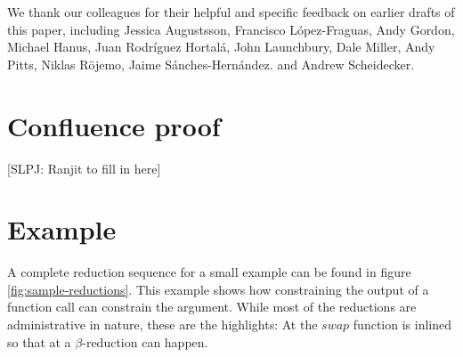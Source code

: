 \documentclass[acmsmall,review,anonymous,dvipsnames]{acmart}
\newcommand{\Varid}[1]{\mathit{#1}}
\newcommand{\simon}[1]{{\color{dkblue} [{SLPJ}: #1]}}
\newcommand{\simon}[1]{}
\begin{document}
\begin{acks}                            %
  We thank our colleagues for their helpful and specific
  feedback on earlier drafts of this paper,
  including
  Jessica Augustsson,
  Francisco L\'opez-Fraguas,
  Andy Gordon,
  Michael Hanus,
  Juan Rodr\'iguez Hortal\'a,
  John Launchbury,
  Dale Miller,
  Andy Pitts,
  Niklas R\"ojemo,
  Jaime S\'anches-Hern\'andez.
  and Andrew Scheidecker.
\end{acks}



\appendix

\section{Confluence proof}

\simon{Ranjit to fill in here}


\section{Example}
A complete reduction sequence for a small example can be found in figure \ref{fig:sample-reductions}.
This example shows how constraining the output of a function call can constrain the argument.
While most of the reductions are administrative in nature, these are the highlights:
At  the \ensuremath{\Varid{swap}} function is inlined so that at  a $\beta$-reduction can happen.
\end{document}
